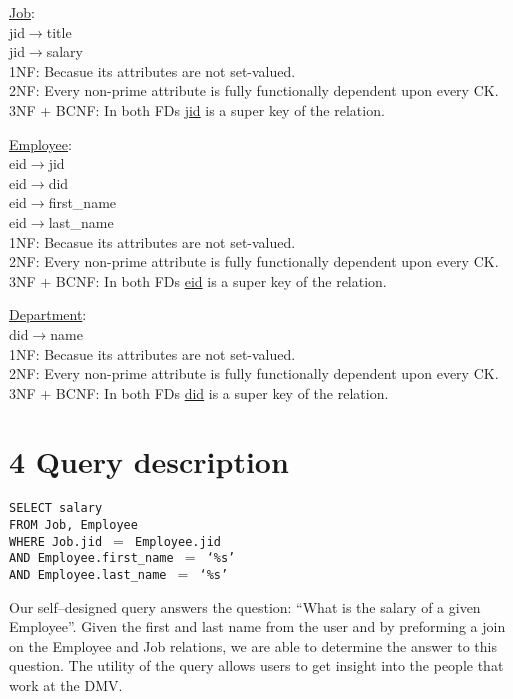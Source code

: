\documentclass[12pt]{article}
\newcommand{\ul}{\underline}
\newcommand\tab[1][1cm]{\hspace*{#1}}
\def\code#1{\texttt{#1}}  %
\begin{document}
\newpage
\ul{Job}:\\
jid$\rightarrow$title\\
jid$\rightarrow$salary\\
1NF: Becasue its attributes are not set-valued.\\
2NF: Every non-prime attribute is fully functionally dependent upon every CK.\\
3NF + BCNF: In both FDs \ul{jid} is a super key of the relation.

\ul{Employee}:\\
eid$\rightarrow$jid\\
eid$\rightarrow$did\\
eid$\rightarrow$first\_name\\
eid$\rightarrow$last\_name\\
1NF: Becasue its attributes are not set-valued.\\
2NF: Every non-prime attribute is fully functionally dependent upon every CK.\\
3NF + BCNF: In both FDs \ul{eid} is a super key of the relation.

\ul{Department}:\\
did$\rightarrow$name\\
1NF: Becasue its attributes are not set-valued.\\
2NF: Every non-prime attribute is fully functionally dependent upon every CK.\\
3NF + BCNF: In both FDs \ul{did} is a super key of the relation.

\newpage
\section*{4 Query description}

\begin{center}
	\begin{minipage}{0.5\linewidth}
	\code{SELECT salary\\
	FROM Job, Employee\\
	WHERE Job.jid $=$ Employee.jid\\
	AND Employee.first\_name $=$ `\%s'\\
	AND Employee.last\_name $=$ `\%s'}
	\end{minipage}
\end{center}

\tab Our self--designed query answers the question: ``What is the salary of a given Employee''. Given the first and last name from the user and by preforming a join on the Employee and Job relations, we are able to determine the answer to this question. The utility of the query allows users to get insight into the people that work at the DMV.
\end{document}
